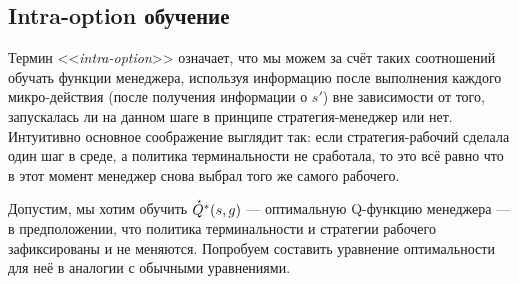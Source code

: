 

\subsection{Intra-option обучение}

Термин <<\emph{intra-option}>> означает, что мы можем за счёт таких соотношений обучать функции менеджера, используя информацию после выполнения каждого микро-действия (после получения информации о $s'$) вне зависимости от того, запускалась ли на данном шаге в принципе стратегия-менеджер или нет. Интуитивно основное соображение выглядит так: если стратегия-рабочий сделала один шаг в среде, а политика терминальности не сработала, то это всё равно что в этот момент менеджер снова выбрал того же самого рабочего.

Допустим, мы хотим обучить $\accentset{\star}{Q}^*(s, g)$ --- оптимальную Q-функцию менеджера --- в предположении, что политика терминальности и стратегии рабочего зафиксированы и не меняются. Попробуем составить уравнение оптимальности для неё в аналогии с обычными уравнениями.

